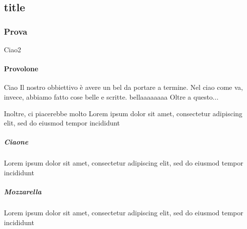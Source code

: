 \subsection{title}

\subsubsection{Prova}

Ciao2

\paragraph{Provolone}

Ciao Il nostro obbiettivo è avere un bel  da portare a termine. Nel  ciao come va, invece, abbiamo fatto cose belle e scritte. bellaaaaaaaa Oltre a questo... 


Inoltre, ci piacerebbe molto Lorem ipsum dolor sit amet, consectetur adipiscing elit, sed do eiusmod tempor incididunt 


\subparagraph{Ciaone}

Lorem ipsum dolor sit amet, consectetur adipiscing elit, sed do eiusmod tempor incididunt 

\subparagraph{Mozzarella}

Lorem ipsum dolor sit amet, consectetur adipiscing elit, sed do eiusmod tempor incididunt